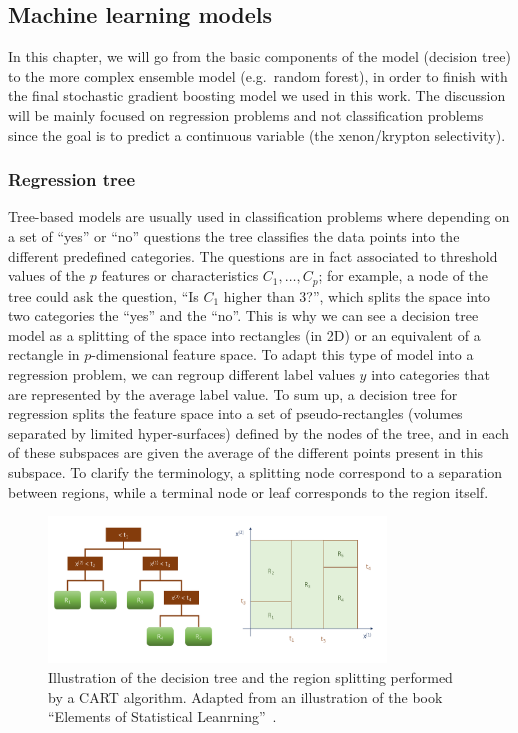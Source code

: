 \documentclass[main]{subfiles}
\begin{document}
\subsection{Machine learning models}\label{sct:model}

In this chapter, we will go from the basic components of the model (decision tree) to the more complex ensemble model (e.g.\ random forest), in order to finish with the final stochastic gradient boosting model we used in this work. The discussion will be mainly focused on regression problems and not classification problems since the goal is to predict a continuous variable (the xenon/krypton selectivity).

\subsubsection{Regression tree}

Tree-based models are usually used in classification problems where depending on a set of ``yes'' or ``no'' questions the tree classifies the data points into the different predefined categories. The questions are in fact associated to threshold values of the $p$ features or characteristics $C_1,\ldots,C_p$; for example, a node of the tree could ask the question, ``Is $C_1$ higher than $3$?'', which splits the space into two categories the ``yes'' and the ``no''. This is why we can see a decision tree model as a splitting of the space into rectangles (in 2D) or an equivalent of a rectangle in $p$-dimensional feature space. To adapt this type of model into a regression problem, we can regroup different label values $y$ into categories that are represented by the average label value. To sum up, a decision tree for regression splits the feature space into a set of pseudo-rectangles (volumes separated by limited hyper-surfaces) defined by the nodes of the tree, and in each of these subspaces are given the average of the different points present in this subspace. To clarify the terminology, a splitting node correspond to a separation between regions, while a terminal node or leaf corresponds to the region itself.

\begin{figure}[ht]
  \centering
  \includegraphics[width=0.8\textwidth]{figures/4-ml/decision_tree.pdf}
  \caption{Illustration of the decision tree and the region splitting performed by a CART\autocite{Breiman_2017} algorithm. Adapted from an illustration of the book ``Elements of Statistical Leanrning''~\cite{Hastie_2009}.}\label{fgr:tree}
\end{figure}
\end{document}
